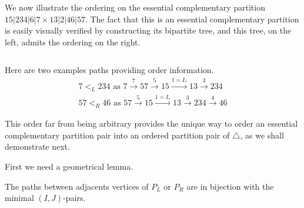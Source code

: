 \begin{example}\label{ex:ECbijection}
We now illustrate the ordering on the essential complementary partition $15|234|6|7 \times 13|2|46|57$. The fact that this is an essential complementary partition is easily visually verified by constructing its bipartite tree, and this tree, on the left, admits the ordering on the right.
\begin{center}
$\quad$
\end{center}
Here are two examples paths providing order information.
\begin{align*}
	7 <_L 234 \text{ as } 7 \xrightarrow{7} 57 \xrightarrow{5} 15 \xrightarrow{1=I_*} 13 \xrightarrow{3} 234\\
	57 <_R 46 \text{ as } 57 \xrightarrow{5} 15 \xrightarrow{1=I_*} 13 \xrightarrow{3} 234 \xrightarrow{4} 46
\end{align*}
\end{example}


This order far from being arbitrary provides the unique way to order an essential complementary partition pair into an ordered partition pair of $\triangle$, as we shall demonstrate next.

First we need a geometrical lemma. 
\begin{proposition}
    The paths between adjacents vertices of $P_L$ or $P_R$ are in bijection with the minimal $(I,J)$-pairs.
\end{proposition}

